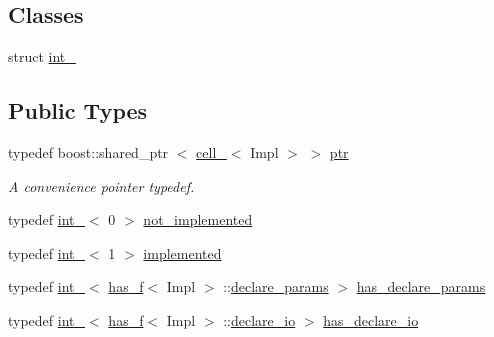 \subsection*{\-Classes}
\begin{DoxyCompactItemize}
\item 
struct \hyperlink{structecto_1_1cell___1_1int__}{int\-\_\-}
\end{DoxyCompactItemize}
\subsection*{\-Public \-Types}
\begin{DoxyCompactItemize}
\item 
typedef boost\-::shared\-\_\-ptr\*
$<$ \hyperlink{structecto_1_1cell__}{cell\-\_\-}$<$ \-Impl $>$ $>$ \hyperlink{structecto_1_1cell___a26d9e255a2ba0335c5e90fd04efa6bfa}{ptr}
\begin{DoxyCompactList}\small\item\em \-A convenience pointer typedef. \end{DoxyCompactList}\item 
typedef \hyperlink{structecto_1_1cell___1_1int__}{int\-\_\-}$<$ 0 $>$ \hyperlink{structecto_1_1cell___a3e48e52421d132bb2bb4e343f771abeb}{not\-\_\-implemented}
\item 
typedef \hyperlink{structecto_1_1cell___1_1int__}{int\-\_\-}$<$ 1 $>$ \hyperlink{structecto_1_1cell___a63c5c3dd95630a508017730ee345c23a}{implemented}
\item 
typedef \hyperlink{structecto_1_1cell___1_1int__}{int\-\_\-}$<$ \hyperlink{structecto_1_1has__f}{has\-\_\-f}$<$ \-Impl $>$\*
\-::\hyperlink{structecto_1_1cell___a6a36edc8e9eddadfe6486460bab93c93}{declare\-\_\-params} $>$ \hyperlink{structecto_1_1cell___ab7b111eb2672ae4eaacc668852b8b89f}{has\-\_\-declare\-\_\-params}
\item 
typedef \hyperlink{structecto_1_1cell___1_1int__}{int\-\_\-}$<$ \hyperlink{structecto_1_1has__f}{has\-\_\-f}$<$ \-Impl $>$\*
\-::\hyperlink{structecto_1_1cell___ac08370823fea8ed7f5991e369f6a7fa7}{declare\-\_\-io} $>$ \hyperlink{structecto_1_1cell___a10ab0d3f85e194d548beb3251416a569}{has\-\_\-declare\-\_\-io}
\end{DoxyCompactItemize}
